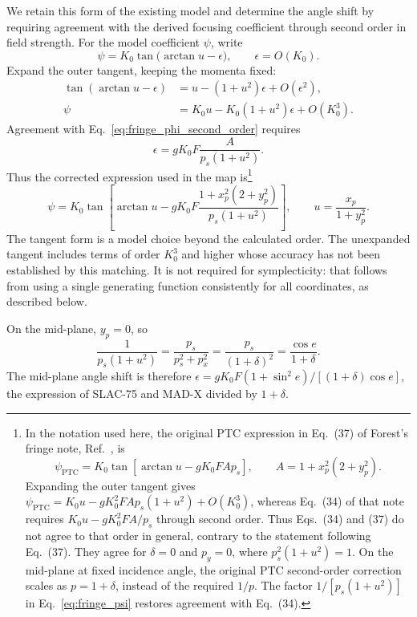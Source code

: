We retain this form of the existing model and determine the angle shift
by requiring agreement with the derived focusing coefficient through
second order in field strength. For the model coefficient $\psi$, write
\begin{equation}
 \psi=K_0\tan\bigl(\arctan u-\epsilon\bigr),\qquad
 \epsilon=O(K_0).
\end{equation}
Expand the outer tangent, keeping the momenta fixed:
\begin{align}
 \tan(\arctan u-\epsilon)
 &=u-(1+u^2)\epsilon+O(\epsilon^2),\\
 \psi&=K_0u-K_0(1+u^2)\epsilon+O(K_0^3).
\end{align}
Agreement with Eq.~\eqref{eq:fringe_phi_second_order} requires
\begin{equation}
 \epsilon=gK_0F\frac{A}{p_s(1+u^2)}.
\end{equation}
Thus the corrected expression used in the map is\footnote{%
In the notation used here, the original PTC expression in Eq.~(37) of
Forest's fringe note, Ref.~\cite{forest-fringe-1}, is
\[
 \psi_{\mathrm{PTC}}=K_0\tan\!\left[\arctan u-gK_0F A p_s\right],
 \qquad A=1+x_p^2(2+y_p^2).
\]
Expanding the outer tangent gives
$\psi_{\mathrm{PTC}}=K_0u-gK_0^2F A p_s(1+u^2)+O(K_0^3)$,
whereas Eq.~(34) of that note requires
$K_0u-gK_0^2F A/p_s$ through second order. Thus Eqs.~(34) and (37)
do not agree to that order in general, contrary to the statement following
Eq.~(37). They agree for $\delta=0$ and $p_y=0$, where
$p_s^2(1+u^2)=1$. On the mid-plane at fixed incidence angle, the original
PTC second-order correction scales as $p=1+\delta$, instead of the required
$1/p$. The factor $1/[p_s(1+u^2)]$ in Eq.~\eqref{eq:fringe_psi}
restores agreement with Eq.~(34).}
\begin{equation}
 \boxed{\displaystyle
 \psi=K_0\tan\left[\arctan u-
       gK_0F\frac{1+x_p^2(2+y_p^2)}{p_s(1+u^2)}\right],
 \qquad u=\frac{x_p}{1+y_p^2}.}
\label{eq:fringe_psi}
\end{equation}
The tangent form is a model choice beyond the calculated order. The
unexpanded tangent includes terms of order $K_0^3$ and higher whose accuracy
has not been established by this matching. It is not required for
symplecticity: that follows from using a single generating function
consistently for all coordinates, as described below.

On the mid-plane, $y_p=0$, so
\begin{equation}
 \frac{1}{p_s(1+u^2)}=\frac{p_s}{p_s^2+p_x^2}
 =\frac{p_s}{(1+\delta)^2}=\frac{\cos e}{1+\delta}.
\end{equation}
The mid-plane angle shift is therefore
$\epsilon=gK_0F(1+\sin^2e)/[(1+\delta)\cos e]$, the expression of SLAC-75
and MAD-X divided by $1+\delta$.

